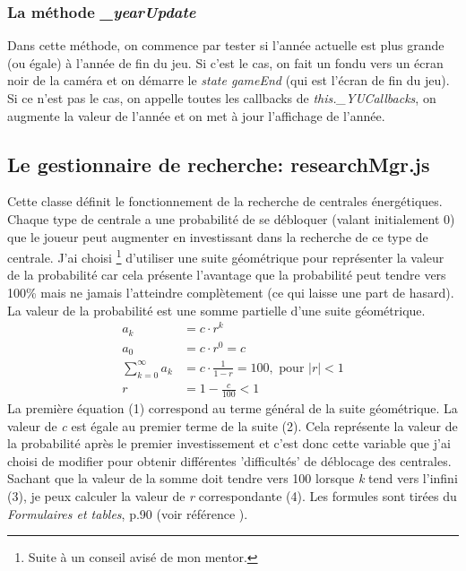\documentclass{article}
\begin{document}
		\subsubsection{La méthode \textit{\_yearUpdate}}
		Dans cette méthode,  on commence par tester si l'année actuelle est plus grande (ou égale) à l'année de fin du jeu. Si c'est le cas, on fait un fondu vers un écran noir de la caméra et on démarre le \textit{state gameEnd} (qui est l'écran de fin du jeu).
		Si ce n'est pas le cas, on appelle toutes les callbacks de \textit{this.\_YUCallbacks}, on augmente la valeur de l'année et on met à jour l'affichage de l'année.
		
		\subsection{Le gestionnaire de recherche: researchMgr.js} \label{researchMgr}
		
		
		Cette classe définit le fonctionnement de la recherche de centrales énergétiques.
		Chaque type de centrale a une probabilité de se débloquer (valant initialement 0) que le joueur peut augmenter en investissant dans la recherche de ce type de centrale. J'ai choisi \footnote{Suite à un conseil avisé de mon mentor.} d'utiliser une suite géométrique pour représenter la valeur de la probabilité car cela présente l'avantage que la probabilité peut tendre vers 100\% mais ne jamais l'atteindre complètement (ce qui laisse une part de hasard).
		La valeur de la probabilité est une somme partielle d'une suite géométrique.
		\begin{align}
  				a_{k} &= c\cdot r^{k}\\
    			a_{0} &= c\cdot r^{0} = c\\
    			\sum_{k=0}^{\infty} a_{k} &= c\cdot \frac{1}{1-r} = 100,\text{ pour } |r|<1 \\
    			r &= 1 - \frac{c}{100} < 1
		\end{align}
		La première équation (1) correspond au terme général de la suite géométrique.
		La valeur de \textit{c} est égale au premier terme de la suite (2). Cela représente la valeur de la probabilité après le premier investissement et c'est donc cette variable que j'ai choisi de modifier pour obtenir différentes 'difficultés' de déblocage des centrales. Sachant que la valeur de la somme doit tendre vers 100 lorsque \textit{k} tend vers l'infini (3), je peux calculer la valeur de \textit{r} correspondante (4). Les formules sont tirées du \textit{Formulaires et tables}, p.90 (voir référence \cite{FetT}).
		
\end{document}
